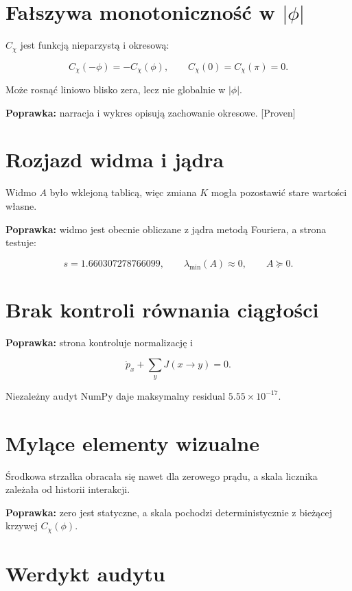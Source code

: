 \documentclass[11pt,a4paper,openany]{report}
\newcommand{\statusProven}{\textcolor{fingreen}{[Proven]}}
\begin{document}
\section{\texorpdfstring{Fałszywa monotoniczność w \(|\phi|\)}{Fałszywa monotoniczność w ||}}

\(C_\chi\) jest funkcją nieparzystą i okresową:

\[
C_\chi(-\phi)=-C_\chi(\phi),\qquad
C_\chi(0)=C_\chi(\pi)=0.
\]

Mo\.ze rosnąć liniowo blisko zera, lecz nie globalnie w \(|\phi|\).

\textbf{Poprawka:} narracja i wykres opisują zachowanie okresowe. \statusProven{}

\section{Rozjazd widma i jądra}

Widmo \(A\) było wklejoną tablicą, więc zmiana \(K\) mogła pozostawić stare wartości własne.

\textbf{Poprawka:} widmo jest obecnie obliczane z jądra metodą Fouriera, a strona testuje:

\[
s=1.660307278766099,\qquad
\lambda_{\min}(A)\approx0,\qquad A\succeq0.
\]

\section{Brak kontroli równania ciągłości}

\textbf{Poprawka:} strona kontroluje normalizację i

\[
\dot p_x+\sum_yJ(x\to y)=0.
\]

Niezale\.zny audyt NumPy daje maksymalny residual \(5.55\times10^{-17}\).

\section{Mylące elementy wizualne}

Środkowa strzałka obracała się nawet dla zerowego prądu, a skala licznika zale\.zała od historii interakcji.

\textbf{Poprawka:} zero jest statyczne, a skala pochodzi deterministycznie z bie\.zącej krzywej \(C_\chi(\phi)\).

\section{Werdykt audytu}
\end{document}
